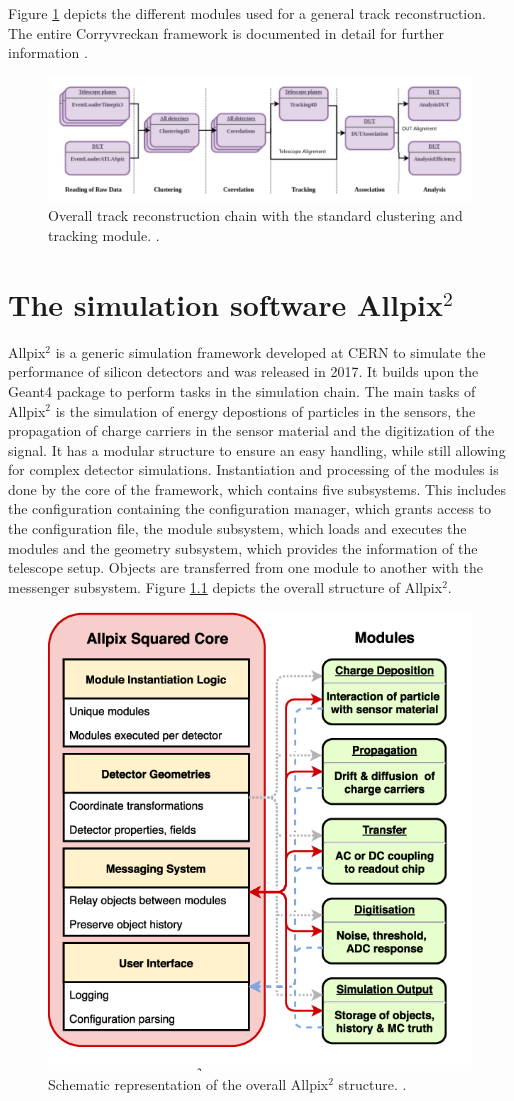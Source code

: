 Figure \ref{fig:corry_track_reco} depicts
the different modules used for a general track reconstruction. The entire Corryvreckan framework is documented in detail for further information \cite{corry_manual}.

\begin{figure}
  \centering
  \includegraphics[height=0.3\textwidth]{images/corry.png}
  \caption{Overall track reconstruction chain with the standard clustering and tracking module. \cite{corry_track_reco}.}
  \label{fig:corry_track_reco}
\end{figure}


\chapter{The simulation software Allpix$^2$}
Allpix$^2$ is a generic simulation framework developed at CERN to simulate the performance of silicon detectors and was released in 2017. It builds upon the
Geant4 \cite{geant4} package to perform tasks in the simulation chain. The main tasks of Allpix$^2$ is the simulation of energy depostions of particles
in the sensors, the propagation of charge carriers in the sensor material and the digitization of the signal. It has a modular
structure to ensure an easy handling, while still allowing for complex detector simulations. Instantiation and processing of the modules is done by the core of the framework,
which contains five subsystems. This includes the configuration containing the configuration manager, which grants access to the configuration file, the
module subsystem, which loads and executes the modules and the geometry subsystem, which provides the information of the telescope setup. Objects are transferred
from one module to another with the messenger subsystem.
Figure \ref{fig:allpix} depicts the overall structure of Allpix$^2$.

\begin{figure}
  \centering
  \includegraphics[height=0.5\textwidth]{images/allpix.png}
  \caption{Schematic representation of the overall Allpix$^2$ structure. \cite{fig_allpix}.}
  \label{fig:allpix}
\end{figure}

